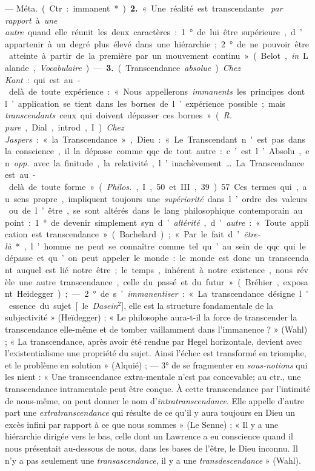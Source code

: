 \begin{itemize}[leftmargin=1cm, label=, itemsep=1pt]
— \si{Méta.} (Ctr. : immanent*). {\bf 2.} « Une réalité est transcendante {\it
par rapport} à {\it une autre} quand elle réunit les deux caractères : 1° de
lui être supérieure, d’appartenir à un degré plus élevé dans une hiérarchie;
2° de ne pouvoir être atteinte à partir de la première par un mouvement
continu » (Belot, {\it in} Lalande, {\it Vocabulaire}). —  {\bf 3.}
(Transcendance {\it absolue}). {\it Chez Kant} : qui est au-delà de toute
expérience : « Nous appellerons {\it immanents} les principes dont
l’application se tient dans les bornes de l’expérience possible ; mais {\it
transcendants} ceux qui doivent dépasser ces bornes » ({\it R. pure}, Dial.,
introd., I). {\it Chez Jaspers} : « la Transcendance », Dieu : « Le
Transcendant n'est pas dans la conscience, il la dépasse comme qqc. de tout
autre : c’est l’Absolu, en {\it opp.} avec la finitude, la relativité,
l’inachèvement… La Transcendance est au-delà de toute forme » ({\it Philos.},
I, 50 et III, 39). 57 Ces termes qui, au sens propre, impliquent toujours une
{\it supériorité} dans l’ordre des valeurs
ou de l’être, se sont altérés dans le lang. philosophique contemporain au
point : 1° de devenir simplement syn. d’{\it altérité}, d'{\it autre} : «
Toute application est transcendance » (Bachelard) ; « Par le fait
d’{\it être-là}*, l’homme ne peut se connaître comme tel qu’au sein de qqc.
qui le dépasse et qu’on peut appeler le monde : le monde est donc un
transcendant auquel est lié notre être ; le temps, inhérent à notre
existence, nous révèle une autre transcendance, celle du passé et du futur
» (Bréhier, exposant Heidegger) ; — 2° de s’{\it immanentiser} : « La
transcendance désigne l'essence du sujet [le {\it Dasein}$^2$], elle est la
structure fondamentale de la subjectivité » (Heïdegger) ; « Le philosophe
aura-t-il la force de transcender la transcendance elle-même et de tomber
vaillamment dans l'immanence ? » (Wahl) ; « La transcendance, après avoir été
rendue par Hegel horizontale, devient avec l’existentialisme une propriété du
sujet. Ainsi l'échec est transformé en triomphe, et le problème en solution
» (Alquié) ; — 3° de se fragmenter en {\it sous-notions} qui les nient : «
Une transcendance extra-mentale n’est pas concevable; au ctr., une
transcendance intramentale peut être conçue. À cette transcendance par
l'intimité de nous-même, on peut donner le nom d’{\it intratranscendance}.
Elle appelle d'autre part une {\it extratranscendance} qui résulte de ce
qu’il y aura toujours en Dieu un excès infini par rapport à ce que nous
sommes » (Le Senne) ; « Il y a une hiérarchie dirigée vers le bas, celle dont
un Lawrence a eu conscience quand il nous présentait au-dessous de nous, dans
les bases de l'être, le Dieu inconnu. Il n’y a pas seulement une
{\it transascendance}, il y a une {\it transdescendance} » (Wahl).


\end{itemize}
